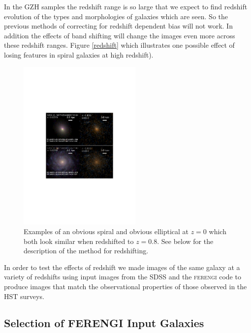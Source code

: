 \documentclass[usenatbib]{mn2e}
\newcommand{\ferengi}{\textsc{ferengi}}
\begin{document}
In the GZH samples the redshift range is so large that we expect to find redshift evolution of the types and morphologies of galaxies which are seen. So the previous methods of correcting for redshift dependent bias will not work. In addition the effects of band shifting will change the images even more across these redshift ranges. Figure \ref{redshift} which illustrates one possible effect of losing features in spiral galaxies at high redshift). 

\begin{figure}
\begin{center}
\includegraphics[width=60mm]{example_ferengi2.pdf}
\caption{Examples of an obvious spiral and obvious elliptical at $z=0$ which both look similar when redshifted to $z=0.8$. See below for the description of the method for redshifting.\label{exampleFERENGI}}
\end{center}
\end{figure}

In order to test the effects of redshift we made images of the same galaxy at a variety of redshifts using input images from the SDSS \citep{yor00,str02} and the \ferengi{} code \citep{bar08a} to produce images that match the observational properties of those observed in the HST surveys. 
 
\subsection{Selection of FERENGI Input Galaxies}
\end{document}
